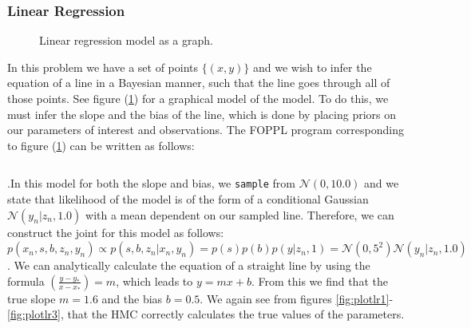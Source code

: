 \documentclass[twoside]{article}
\begin{document}
\subsubsection{Linear Regression}
\begin{figure}[ht]
	\label{fig:lrgraph}
	\begin{center}
		
	\end{center}
	\caption{Linear regression model as a graph.}
\end{figure}
In this problem we have a set of points $\{(x,y)\}$ and we wish to infer the equation of a line in a Bayesian manner, such that the line goes through all of those points. See figure (\ref{fig:lrgraph}) for a graphical model of the model. To do this, we must infer the slope and the bias of the line, which is done by placing priors on our parameters of interest and observations. The FOPPL program corresponding to figure (\ref{fig:lrgraph}) can be written as follows: \inputminted{clojure}{code/linearregression.clj}.In this model for both the slope and bias, we \texttt{sample} from $\mathcal{N}(0,10.0)$ and we state that likelihood of the model is of the form of a conditional Gaussian $\mathcal{N}(y_{n}| z_{n}, 1.0)$ with a mean dependent on our sampled line.   Therefore, we can construct the joint for this model as follows: 
$p(x_{n},s,b,z_{n}, y_{n}) \propto p(s,b,z_{n} | x_{n}, y_{n}) = p(s)p(b)p(y | z_{n}, 1) =\mathcal{N}(0,5^{2})\mathcal{N}(y_{n}|z_{n},1.0)$. We can analytically calculate the equation of a straight line by using the formula $\left(\frac{y - y_{*}}{x - x_{*}}\right) = m$, which leads to $y = mx + b$. From this we find that the true slope $m = 1.6$ and the bias $b = 0.5$. We again see from figures \ref{fig:plotlr1}-\ref{fig:plotlr3}, that the HMC correctly calculates the true values of the parameters.\\
	
\end{document}
